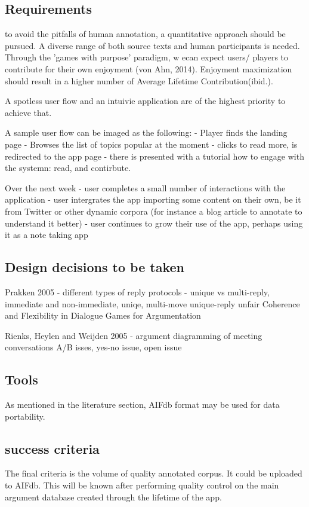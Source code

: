 \documentclass{article}
\begin{document}
\subsection{Requirements}
to avoid the pitfalls of human annotation, a quantitative approach should be pursued. 
A diverse range of both source texts and human participants is needed.
Through the 'games with purpose' paradigm, w ecan expect users/ players to contribute for their own enjoyment (von Ahn, 2014).
Enjoyment maximization should result in a higher number of Average Lifetime Contribution(ibid.).

A spotless user flow and an intuivie application are of the highest priority to achieve that.

A sample user flow can be imaged as the following:
- Player finds the landing page
- Browses the list of topics popular at the moment
- clicks to read more, is redirected to the app page
- there is presented with a tutorial how to engage with the systemn: read, and contirbute.

Over the next week
- user completes a small number of interactions with the application
- user intergrates the app importing some content on their own, be it from Twitter or other dynamic corpora (for instance a blog article to annotate to understand it better)
- user continues to grow their use of the app, perhaps using it as a note taking app


\subsection{Design decisions to be taken}
Prakken 2005 - different types of reply protocols - unique vs multi-reply, immediate and non-immediate, uniqe, multi-move
unique-reply unfair
Coherence and Flexibility in Dialogue Games for Argumentation 

Rienks, Heylen and Weijden 2005 - argument diagramming of meeting conversations
A/B isses, yes-no issue, open issue

\subsection{Tools }
As mentioned in the literature section, AIFdb format may be used for data portability.

\subsection{success criteria}
The final criteria is the volume of quality annotated corpus. It could be uploaded to AIFdb. 
This will be known after performing quality control on the main argument database created through the lifetime of the app. 
\end{document}
